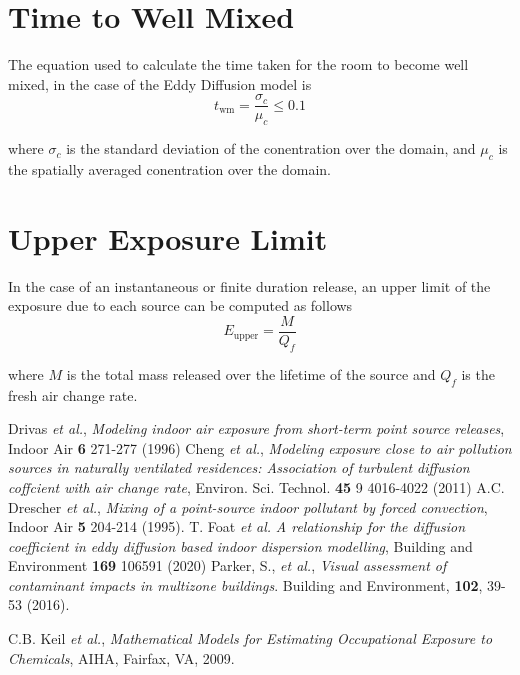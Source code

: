\documentclass[]{article}
\begin{document}
\section{Time to Well Mixed}\label{app:timetowellmixed}
The equation used to calculate the time taken for the room to become well mixed,
in the case of the Eddy Diffusion model is \cite{drescher95}
\begin{equation}
    t_{\text{wm}}=\frac{\sigma_{c}}{\mu_{c}} \leq 0.1
\end{equation}

\noindent where $\sigma_{c}$ is the standard deviation of the conentration over
the domain, and $\mu_{c}$ is the spatially averaged conentration over the
domain.

\section{Upper Exposure Limit}\label{app:upperexpolimit}
In the case of an instantaneous or finite duration release, an upper limit of
the exposure due to each source can be computed as follows \cite{parker16}
\begin{equation}
    E_{\text{upper}} = \frac{M}{Q_{f}}
\end{equation}

\noindent where $M$ is the total mass released over the lifetime of the source
and $Q_f$ is the fresh air change rate.

\begin{thebibliography}{10}
     Drivas \emph{et al.}, \emph{Modeling indoor air exposure from
    short-term point source releases}, Indoor Air \textbf{6}
271-277 (1996)
 Cheng \emph{et al.}, \emph{Modeling exposure close to air pollution
sources in naturally ventilated residences: Association of turbulent diffusion
coffcient with air change rate}, Environ. Sci. Technol. \textbf{45} 9
4016-4022 (2011)
     A.C. Drescher \emph{et al.}, \emph{Mixing of a point-source
    indoor pollutant by forced convection}, Indoor Air \textbf{5}
    204-214 (1995).
     T. Foat \emph{et al.} \emph{A relationship for the diffusion coefficient
    in eddy diffusion based indoor dispersion modelling}, Building and
    Environment \textbf{169} 106591 (2020) 
     Parker, S., \emph{et al.}, \emph{Visual assessment
    of contaminant impacts in multizone buildings}. Building and Environment,
    \textbf{102}, 39-53 (2016).  
    
     C.B. Keil \emph{et al.}, \emph{Mathematical Models for Estimating
Occupational Exposure to Chemicals}, AIHA, Fairfax, VA, 2009.
\end{thebibliography}
\end{document}
